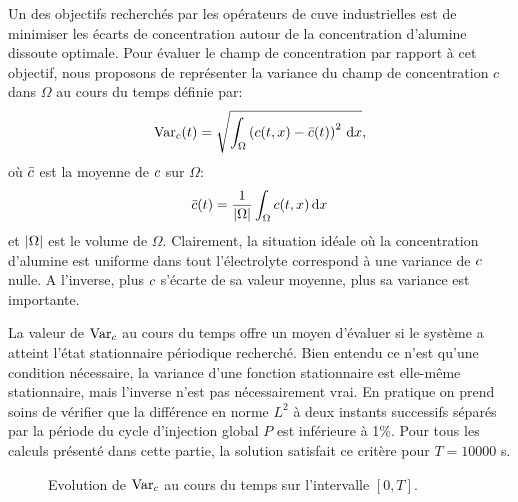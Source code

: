 Un des objectifs recherchés par les opérateurs de cuve
industrielles est de minimiser les écarts de concentration autour de
la concentration d'alumine dissoute optimale. Pour évaluer le champ
de concentration par rapport à cet objectif, nous proposons de
représenter la variance  du champ de concentration
$c$ dans $\Omega$ au cours du temps définie par:
\begin{equation}
  \operatorname{Var}_c(t) = \sqrt{\int_\Omega\left( c(t, x) - \bar {c}(t) \right)^2\,\mathrm dx},
\end{equation}
où $\bar {c}$ est la moyenne de $c$ sur
$\Omega$:
\begin{equation}
  \bar {c}(t) = \frac{1}{\left\lvert \Omega \right\rvert}\int_\Omega c(t, x)\,\mathrm dx
\end{equation}
et $\left\lvert \Omega \right\rvert$ est le volume de $\Omega$. Clairement, la situation
idéale où la concentration d'alumine est uniforme dans tout
l'électrolyte correspond à une variance de $c$ nulle. A
l'inverse, plus $c$ s'écarte de sa valeur moyenne, plus
sa variance est importante.

La valeur de $\operatorname{Var}_c$ au cours du temps offre un moyen
d'évaluer si le système a atteint l'état stationnaire périodique
recherché. Bien entendu ce n'est qu'une condition nécessaire, la
variance d'une fonction stationnaire est elle-même stationnaire, mais
l'inverse n'est pas nécessairement vrai. En pratique on prend soins de
vérifier que la différence en norme $L^2$ à deux instants successifs
séparés par la période du cycle d'injection global $P$ est inférieure
à \num{1}\%. Pour tous les calculs présenté dans cette partie, la
solution satisfait ce critère pour $T = \num{10000}$ \si{\second}.

\begin{figure}
  \begin{center}
    
    \caption{Evolution de $\operatorname{Var}_c$ au cours du temps sur
      l'intervalle $[0, T]$.}
    \label{fig:alumin-control-var}
  \end{center}
\end{figure}

